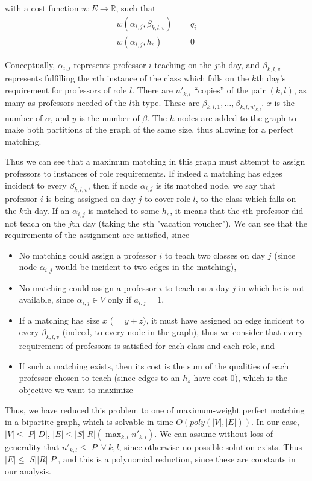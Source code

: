 with a cost function $w: E \to \mathbb{R}$, such that
\begin{align*}
w(\alpha_{i, j}, \beta_{k, l, v}) &= q_i\\
w(\alpha_{i, j}, h_s) &= 0
\end{align*}

Conceptually, $\alpha_{i, j}$ represents professor $i$ teaching on the $j$th day, and $\beta_{k, l, v}$ represents fulfilling the $v$th instance of the class which falls on the $k$th day's requirement for professors of role $l$. There are $n'_{k, l}$ ``copies'' of the pair $(k, l)$, as many as professors needed of the $l$th type. These are $\beta_{k, l, 1}, \dots, \beta_{k, l, n'_{k, l}}$. $x$ is the number of $\alpha$, and $y$ is the number of $\beta$. The $h$ nodes are added to the graph to make both partitions of the graph of the same size, thus allowing for a perfect matching.

Thus we can see that a maximum matching in this graph must attempt to assign professors to instances of role requirements. If indeed a matching has edges incident to every $\beta_{k, l, v}$, then if node $\alpha_{i, j}$ is its matched node, we say that professor $i$ is being assigned on day $j$ to cover role $l$, to the class which falls on the $k$th day. If an $\alpha_{i, j}$ is matched to some $h_s$, it means that the $i$th professor did not teach on the $j$th day (taking the $s$th "vacation voucher"). We can see that the requirements of the assignment are satisfied, since

\begin{itemize}
\item No matching could assign a professor $i$ to teach two classes on day $j$ (since node $\alpha_{i, j}$ would be incident to two edges in the matching),
\item No matching could assign a professor $i$ to teach on a day $j$ in which he is not available, since $\alpha_{i, j} \in V$ only if $a_{i, j} = 1$,
\item If a matching has size $x$ ($= y + z$), it must have assigned an edge incident to every $\beta_{k, l, v}$ (indeed, to every node in the graph), thus we consider that every requirement of professors is satisfied for each class and each role, and
\item If such a matching exists, then its cost is the sum of the qualities of each professor chosen to teach (since edges to an $h_s$ have cost 0), which is the objective we want to maximize
\end{itemize}

Thus, we have reduced this problem to one of maximum-weight perfect matching in a bipartite graph, which is solvable in time $O(poly(|V|, |E|))$. In our case, $|V| \le |P||D|$, $|E| \le |S||R|(\max_{k, l} n'_{k, l})$. We can assume without loss of generality that $n'_{k, l} \le |P|\ \forall\ k, l$, since otherwise no possible solution exists. Thus $|E| \le |S||R||P|$, and this is a polynomial reduction, since these are constants in our analysis.

